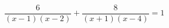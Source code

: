 \begin{ex}[type=equation]
	\begin{condition}
		$\dfrac{6}{(x - 1)(x - 2)} + \dfrac{8}{(x + 1)(x - 4)} = 1$
	\end{condition}
\end{ex}
